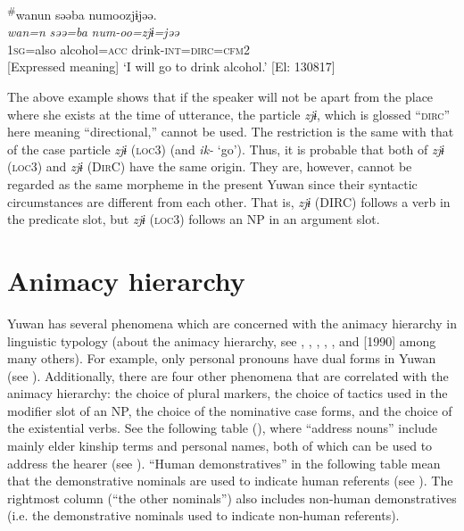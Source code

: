 {\TM}
\glll \textsuperscript{\#}wanun  səəba  numoozjɨjəə.\\
\textit{wan=n}  \textit{səə=ba}  \textit{num-oo=zjɨ=jəə}\\
    1\textsc{sg}=also  alcohol=\textsc{acc}  drink-\textsc{int}=\textsc{dirc}=\textsc{cfm}2\\
    {}[Expressed meaning] ‘I will go to drink alcohol.’ [El: 130817]
    \z

The above example shows that if the speaker will not be apart from the place where she exists at the time of utterance, the particle \textit{zjɨ}, which is glossed “\textsc{dirc}” here meaning “directional,” cannot be used. The restriction is the same with that of the case particle \textit{zjɨ} (\textsc{loc3}) (and \textit{ik-} ‘go’). Thus, it is probable that both of \textit{zjɨ} (\textsc{loc3}) and \textit{zjɨ} (D\textsc{ir}C) have the same origin. They are, however, cannot be regarded as the same morpheme in the present Yuwan since their syntactic circumstances are different from each other. That is, \textit{zjɨ} (DIRC) follows a verb in the predicate slot, but \textit{zjɨ} (\textsc{loc3}) follows an NP in an argument slot.

\section{Animacy hierarchy}

Yuwan has several phenomena which are concerned with the animacy hierarchy in linguistic typology (about the animacy hierarchy, see \citealt{Silverstein1976}, \citealt{Comrie1989}, \citealt{Dixon1994}, \citealt{Whaley1997}, \citealt{Corbett2000}, and \citealt{Croft2003} [1990] among many others). For example, only personal pronouns have dual forms in Yuwan (see ). Additionally, there are four other phenomena that are correlated with the animacy hierarchy: the choice of plural markers, the choice of tactics used in the modifier slot of an NP, the choice of the nominative case forms, and the choice of the existential verbs. See the following table (), where “address nouns” include mainly elder kinship terms and personal names, both of which can be used to address the hearer (see ). “Human demonstratives” in the following table mean that the demonstrative nominals are used to indicate human referents (see ). The rightmost column (“the other nominals”) also includes non-human demonstratives (i.e. the demonstrative nominals used to indicate non-human referents).


